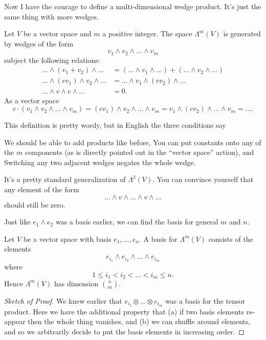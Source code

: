 Now I have the courage to define a multi-dimensional wedge product.
It's just the same thing with more wedges.
\begin{definition}
	Let $V$ be a vector space and $m$ a positive integer.
	The space $\Lambda^m(V)$ is generated by wedges of the form
	\[ v_1 \wedge v_2 \wedge \dots \wedge v_m \]
	subject the following relations:
	\begin{align*}
		\dots \wedge (v_1+v_2) \wedge \dots
			&= (\dots \wedge v_1 \wedge \dots)
			 + (\dots \wedge v_2 \wedge \dots) \\
		\dots \wedge (cv_1) \wedge v_2 \wedge \dots
			&= \dots \wedge v_1 \wedge (cv_2) \wedge \dots  \\
		\dots \wedge v \wedge v \wedge \dots
			&= 0.
	\end{align*}
	As a vector space
	\[ c \cdot (v_1 \wedge v_2 \wedge \dots \wedge v_m)
	 = (cv_1) \wedge v_2 \wedge \dots \wedge v_m
	 = v_1 \wedge (cv_2) \wedge \dots \wedge v_m
	 = \dots .
	\]
\end{definition}
This definition is pretty wordy, but in English the three conditions say
\begin{itemize}
	\ii We should be able to add products like before,
	\ii You can put constants onto any of the $m$ components
	(as is directly pointed out in the ``vector space'' action), and
	\ii Switching any two adjacent wedges negates the whole wedge.
\end{itemize}
It's a pretty standard generalization of $\Lambda^2(V)$.
You can convince yourself that any element of the form
\[ \dots \wedge v \wedge \dots \wedge v \wedge \dots \]
should still be zero.

Just like $e_1 \wedge e_2$ was a basis earlier, we can find the basis
for general $m$ and $n$.
\begin{proposition}
	Let $V$ be a vector space with basis $e_1, \dots, e_n$.
	A basis for $\Lambda^m(V)$ consists of the elements
	\[ e_{i_1} \wedge e_{i_2} \wedge \dots \wedge e_{i_m} \]
	where
	\[ 1 \le i_1 < i_2 < \dots < i_m \le n. \]
	Hence $\Lambda^m(V)$ has dimension $\binom nm$.
\end{proposition}
\begin{proof}[Sketch of Proof]
	We knew earlier that $e_{i_1} \otimes \dots \otimes e_{i_m}$ was a basis for the tensor product.
	Here we have the additional property that (a) if two basis elements re-appear then the whole thing vanishes, and
	(b) we can shuffle around elements, and so we arbitrarily decide to put the basis elements
	in increasing order.
\end{proof}


